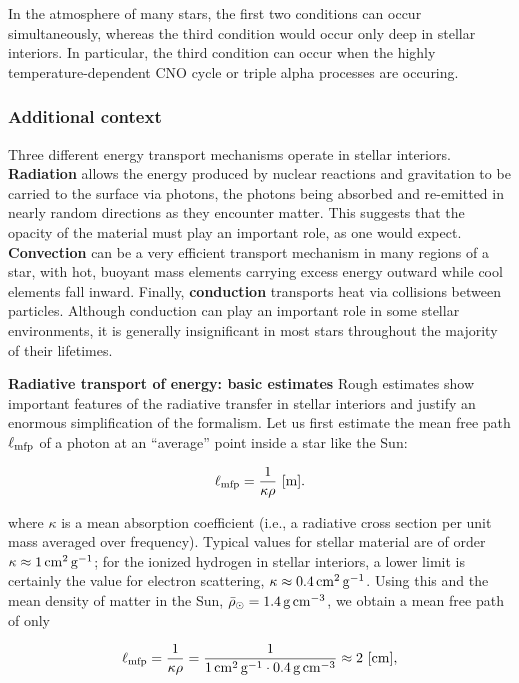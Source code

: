 \documentclass[a4paper,10pt]{article}
\begin{document}
{\noindent}In the atmosphere of many stars, the first two conditions can occur simultaneously, whereas the third condition would occur only deep in stellar interiors. In particular, the third condition can occur when the highly temperature-dependent CNO cycle or triple alpha processes are occuring.

\subsubsection{Additional context}

Three different energy transport mechanisms operate in stellar interiors. \textbf{Radiation} allows the energy produced by nuclear reactions and gravitation to be carried to the surface via photons, the photons being absorbed and re-emitted in nearly random directions as they encounter matter. This suggests that the opacity of the material must play an important role, as one would expect. \textbf{Convection} can be a very efficient transport mechanism in many regions of a star, with hot, buoyant mass elements carrying excess energy outward while cool elements fall inward. Finally, \textbf{conduction} transports heat via collisions between particles. Although conduction can play an important role in some stellar environments, it is generally insignificant in most stars throughout the majority of their lifetimes. 

{\noindent}\textbf{Radiative transport of energy: basic estimates} Rough estimates show important features of the radiative transfer in stellar interiors and justify an enormous simplification of the formalism. Let us first estimate the mean free path $\ell_{\rm mfp}$ of a photon at an ``average'' point inside a star like the Sun:

\begin{align*}
    \ell_{\rm mfp} = \frac{1}{\kappa\rho} ~ [{\rm m}].
\end{align*}

{\noindent}where $\kappa$ is a mean absorption coefficient (i.e., a radiative cross section per unit mass averaged over frequency). Typical values for stellar material are of order $\kappa\approx1\,{\rm cm^2\,g^{-1}}$; for the ionized hydrogen in stellar interiors, a lower limit is certainly the value for electron scattering, $\kappa\approx0.4\,{\rm cm^2\,g^{-1}}$. Using this and the mean density of matter in the Sun, $\bar{\rho}_\odot=1.4\,{\rm g\,cm^{-3}}$, we obtain a mean free path of only

\begin{align*}
    \ell_{\rm mfp} = \frac{1}{\kappa\rho} = \frac{1}{1\,{\rm cm^2\,g^{-1}}\cdot0.4\,{\rm g\,cm^{-3}}} \approx2 ~ [{\rm cm}],
\end{align*}
\end{document}
